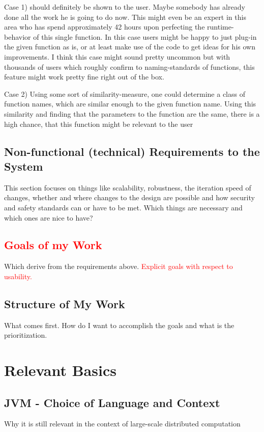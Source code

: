 \documentclass[12p]{scrartcl}
\begin{document}
Case 1) 
should definitely be shown to the user. Maybe somebody has already done all the work he is going to do now. This might even be an expert in this area who has spend approximately 42 hours upon perfecting the runtime-behavior of this single function. In this case users might be happy to just plug-in the given function as is, or at least make use of the code to get ideas for his own improvements. I think this case might sound pretty uncommon but with thousands of users which roughly confirm to naming-standards of functions, this feature might work pretty fine right out of the box.

Case 2)
Using some sort of similarity-measure, one could determine a class of function names, which are similar enough to the given function name. Using this similarity and finding that the parameters to the function are the same, there is a high chance, that this function might be relevant to the user

\subsection{Non-functional (technical) Requirements to the System}
This section focuses on things like scalability, robustness, the iteration speed of changes, whether and where changes to the design are possible and how security and safety standards can or have to be met. Which things are necessary and which ones are nice to have?


\subsection{\textcolor{red}{Goals of my Work}}
Which derive from the requirements above. \textcolor{red}{Explicit goals with respect to usability.}


\subsection{Structure of My Work}
What comes first. How do I want to accomplish the goals and what is the prioritization.


\section{Relevant Basics}
\label{sec:basics}
\subsection{JVM - Choice of Language and Context}
Why it is still relevant in the context of large-scale distributed computation
\end{document}
